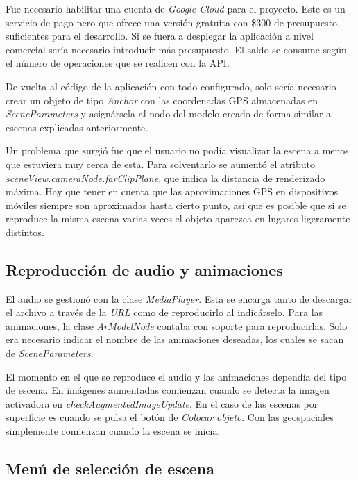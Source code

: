 Fue necesario habilitar una cuenta de \textit{Google Cloud} para el proyecto. Este es un servicio de pago pero que ofrece una versión gratuita con \$300 de presupuesto, suficientes para el desarrollo. Si se fuera a desplegar la aplicación a nivel comercial sería necesario introducir más presupuesto. El saldo se consume según el número de operaciones que se realicen con la API.

De vuelta al código de la aplicación con todo configurado, solo sería necesario crear un objeto de tipo \textit{Anchor} con las coordenadas GPS almacenadas en \textit{SceneParameters} y asignársela al nodo del modelo creado de forma similar a escenas explicadas anteriormente.

Un problema que surgió fue que el usuario no podía visualizar la escena a menos que estuviera muy cerca de esta. Para solventarlo se aumentó el atributo \textit{sceneView.cameraNode.farClipPlane}, que indica la distancia de renderizado máxima. Hay que tener en cuenta que las aproximaciones GPS en dispositivos móviles siempre son aproximadas hasta cierto punto, así que es posible que si se reproduce la misma escena varias veces el objeto aparezca en lugares ligeramente distintos. 

\subsection{Reproducción de audio y animaciones}

El audio se gestionó con la clase \textit{MediaPlayer}. Esta se encarga tanto de descargar el archivo a través de la \textit{URL} como de reproducirlo al indicárselo. Para las animaciones, la clase \textit{ArModelNode} contaba con soporte para reproducirlas. Solo era necesario indicar el nombre de las animaciones deseadas, los cuales se sacan de \textit{SceneParameters}.

El momento en el que se reproduce el audio y las animaciones dependía del tipo de escena. En imágenes aumentadas comienzan cuando se detecta la imagen activadora en \textit{checkAugmentedImageUpdate}. En el caso de las escenas por superficie es cuando se pulsa el botón de \textit{Colocar objeto}. Con las geospaciales simplemente comienzan cuando la escena se inicia.

\subsection{Menú de selección de escena}

